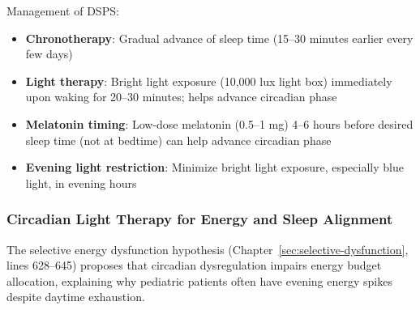 Management of DSPS:
\begin{itemize}
    \item \textbf{Chronotherapy}: Gradual advance of sleep time (15--30 minutes earlier every few days)
    \item \textbf{Light therapy}: Bright light exposure (10,000 lux light box) immediately upon waking for 20--30 minutes; helps advance circadian phase
    \item \textbf{Melatonin timing}: Low-dose melatonin (0.5--1 mg) 4--6 hours before desired sleep time (not at bedtime) can help advance circadian phase
    \item \textbf{Evening light restriction}: Minimize bright light exposure, especially blue light, in evening hours
\end{itemize}

\subsubsection{Circadian Light Therapy for Energy and Sleep Alignment}

\begin{hypothesis}
The selective energy dysfunction hypothesis (Chapter~\ref{sec:selective-dysfunction}, lines 628--645) proposes that circadian dysregulation impairs energy budget allocation, explaining why pediatric patients often have evening energy spikes despite daytime exhaustion.
\end{hypothesis}

